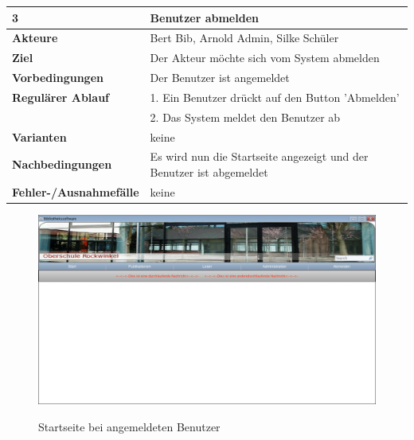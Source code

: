 \documentclass[fontsize=12pt,paper=a4,twoside]{scrartcl}
\begin{document}
\begin{table}[htbp]
\label{3}
\begin{tabular}{|l|p{10cm}|}
\hline 
\textbf{3} & \textbf{Benutzer abmelden} \\ \hline
\textbf{Akteure} & Bert Bib, Arnold Admin, Silke Schüler \\ \hline
\textbf{Ziel} & Der Akteur möchte sich vom System abmelden  \\ \hline
\textbf{Vorbedingungen} & Der Benutzer ist angemeldet  \\ \hline
\textbf{Regulärer Ablauf} & 
1. Ein Benutzer drückt auf den Button 'Abmelden' \\
&2. Das System meldet den Benutzer ab\\
\hline
\textbf{Varianten} & 
keine \\ \hline
\textbf{Nachbedingungen} & Es wird nun die Startseite angezeigt und der Benutzer ist abgemeldet\\
\hline
\textbf{Fehler-/Ausnahmefälle} & keine
\end{tabular}
\end{table}

\begin{figure}[htbp]
\caption{Startseite bei angemeldeten Benutzer}
\includegraphics[width=1\textwidth]{WebApp-Screens/Startscreen-loggedIn.png}
  \label{startlog}
\end{figure}
\end{document}
